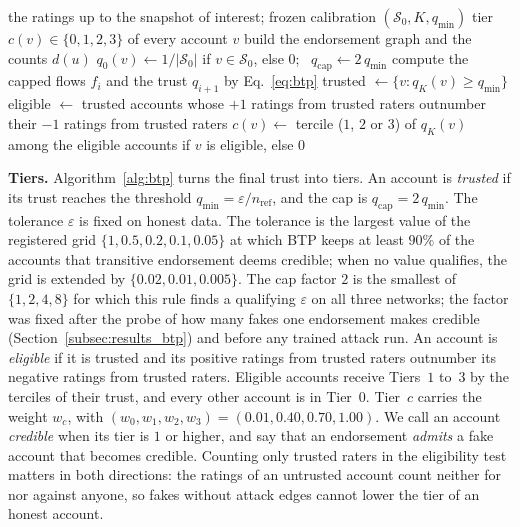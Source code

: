 \documentclass[lettersize,journal]{IEEEtran}
\begin{document}
\begin{algorithm}[!t]
\caption{Budgeted trust propagation (credibility tiers)}
\label{alg:btp}
\footnotesize
\begin{algorithmic}[1]
\Require the ratings up to the snapshot of interest; frozen calibration $(\mathcal{S}_0, K, q_{\min})$
\Ensure tier $c(v) \in \{0, 1, 2, 3\}$ of every account $v$
\State build the endorsement graph and the counts $d(u)$
\State $q_0(v) \gets 1/|\mathcal{S}_0|$ if $v \in \mathcal{S}_0$, else $0$; \ $q_{\mathrm{cap}} \gets 2\,q_{\min}$
  \State compute the capped flows $f_i$ and the trust $q_{i+1}$ by Eq.~\eqref{eq:btp}
\EndFor
\State trusted $\gets \{v : q_K(v) \ge q_{\min}\}$
\State eligible $\gets$ trusted accounts whose $+1$ ratings from trusted raters outnumber their $-1$ ratings from trusted raters
\State $c(v) \gets$ tercile ($1$, $2$ or $3$) of $q_K(v)$ among the eligible accounts if $v$ is eligible, else $0$
\end{algorithmic}
\end{algorithm}

\smallskip\noindent\textbf{Tiers.}
Algorithm~\ref{alg:btp} turns the final trust into tiers.
An account is \emph{trusted} if its trust reaches the threshold $q_{\min} = \varepsilon / n_{\mathrm{ref}}$, and the cap is $q_{\mathrm{cap}} = 2\,q_{\min}$.
The tolerance $\varepsilon$ is fixed on honest data.
The tolerance is the largest value of the registered grid $\{1, 0.5, 0.2, 0.1, 0.05\}$ at which BTP keeps at least $90\%$ of the accounts that transitive endorsement deems credible; when no value qualifies, the grid is extended by $\{0.02, 0.01, 0.005\}$.
The cap factor $2$ is the smallest of $\{1, 2, 4, 8\}$ for which this rule finds a qualifying $\varepsilon$ on all three networks; the factor was fixed after the probe of how many fakes one endorsement makes credible (Section~\ref{subsec:results_btp}) and before any trained attack run.
An account is \emph{eligible} if it is trusted and its positive ratings from trusted raters outnumber its negative ratings from trusted raters.
Eligible accounts receive Tiers~$1$ to~$3$ by the terciles of their trust, and every other account is in Tier~$0$.
Tier~$c$ carries the weight $w_c$, with $(w_0, w_1, w_2, w_3) = (0.01, 0.40, 0.70, 1.00)$.
We call an account \emph{credible} when its tier is $1$ or higher, and say that an endorsement \emph{admits} a fake account that becomes credible.
Counting only trusted raters in the eligibility test matters in both directions: the ratings of an untrusted account count neither for nor against anyone, so fakes without attack edges cannot lower the tier of an honest account.
\end{document}
